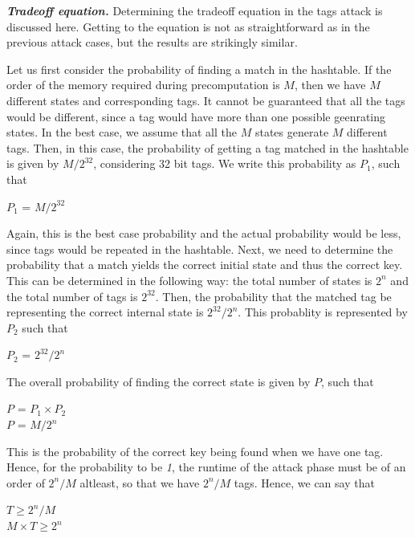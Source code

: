 \textit{\textbf{Tradeoff equation.}} Determining the tradeoff equation in the tags attack is discussed here. Getting to the equation is not as straightforward as in the previous attack cases, but the results are strikingly similar.

Let us first consider the probability of finding a match in the hashtable. If the order of the memory required during precomputation is $M$, then we have $M$ different states and corresponding tags. It cannot be guaranteed that all the tags would be different, since a tag would have more than one possible geenrating states. In the best case, we assume that all the $M$ states generate $M$ different tags. Then, in this case, the probability of getting a tag matched in the hashtable is given by $M/2^{32}$, considering 32 bit tags. We write this probability as $P_1$, such that

\begin{center}
\large{$P_1$ = $M/2^{32}$}
\end{center}

Again, this is the best case probability and the actual probability would be less, since tags would be repeated in the hashtable. Next, we need to determine the probability that a match yields the correct initial state and thus the correct key. This can be determined in the following way: the total number of states is $2^n$ and the total number of tags is $2^{32}$. Then, the probability that the matched tag be representing the correct internal state is $2^{32}/2^n$. This probablity is represented by $P_2$ such that

\begin{center}
\large{$P_2$ = $2^{32}/2^n$}
\end{center}

The overall probability of finding the correct state is given by $P$, such that

\begin{center}
\large{$P$ = $P_1 \times P_2$}\\
\large{$P$ = $M/2^{n}$}\\
\end{center}

This is the probability of the correct key being found when we have one tag. Hence, for the probability to be \emph{1}, the runtime of the attack phase must be of an order of $2^{n}/M$ altleast, so that we have $2^{n}/M$ tags. Hence, we can say that

\begin{center}
\large{$T \geq 2^{n}/M$}\\
\large{$M \times T \geq 2^{n}$}
\end{center}

